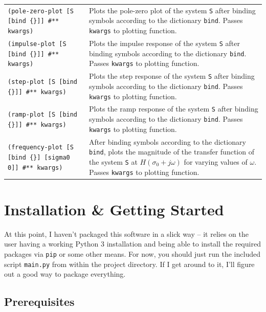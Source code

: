 \documentclass[11pt,letter]{article}
\begin{document}
\begin{longtable}{ p{} p{} }
  \texttt{(pole-zero-plot [S [bind \{\}]] \#** kwargs)}
  &
  Plots the pole-zero plot of the system \texttt{S} after binding symbols according to the dictionary \texttt{bind}.
  Passes \texttt{kwargs} to plotting function. \\

  \texttt{(impulse-plot [S [bind \{\}]] \#** kwargs)}
  &
  Plots the impulse response of the system \texttt{S} after binding symbols according to the dictionary \texttt{bind}.
  Passes \texttt{kwargs} to plotting function. \\

  \texttt{(step-plot [S [bind \{\}]] \#** kwargs)}
  &
  Plots the step response of the system \texttt{S} after binding symbols according to the dictionary \texttt{bind}.
  Passes \texttt{kwargs} to plotting function. \\

  \texttt{(ramp-plot [S [bind \{\}]] \#** kwargs)}
  &
  Plots the ramp response of the system \texttt{S} after binding symbols according to the dictionary \texttt{bind}.
  Passes \texttt{kwargs} to plotting function. \\

  \texttt{(frequency-plot [S [bind \{\}] [sigma0 0]] \#** kwargs)}
  &
  After binding symbols according to the dictionary \texttt{bind}, plots the magnitude of the transfer function of the system \texttt{S} at $H(\sigma_0+j\omega)$ for varying values of $\omega$.
  Passes \texttt{kwargs} to plotting function.
\end{longtable}

\newpage

\appendix

\section{Installation \& Getting Started}

At this point, I haven't packaged this software in a slick way -- it relies on the user having a working Python 3 installation and being able to install the required packages via \texttt{pip} or some other means.
For now, you should just run the included script \texttt{main.py} from within the project directory.
If I get around to it, I'll figure out a good way to package everything.

\subsection{Prerequisites}
\end{document}
